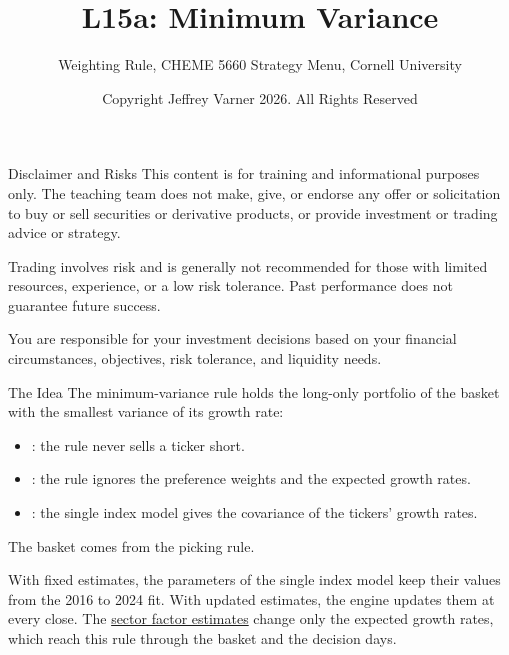 \documentclass[aspectratio=169,11pt]{beamer}
\title{\texorpdfstring{{\vnheavy L15a}}{L15a}: Minimum Variance}
\subtitle{Weighting Rule, CHEME 5660 Strategy Menu, Cornell University}
\author{Copyright Jeffrey Varner 2026. All Rights Reserved}
\newcommand{\repo}{https://github.com/varnerlab/CHEME-5660-CourseRepository-Fall-2026/blob/main/lectures/week-15/L15a}
\begin{document}
\vntitlepage

\begin{frame}{Disclaimer and Risks}
  \vspace{0.6em}
  \textbf{} This content is for training and informational
  purposes only. The teaching team does not make, give, or endorse any offer or
  solicitation to buy or sell securities or derivative products, or provide
  investment or trading advice or strategy.

  \vspace{1.1em}
  \textbf{} Trading involves risk and is generally not recommended for
  those with limited resources, experience, or a low risk tolerance. Past
  performance does not guarantee future success.

  \vspace{1.1em}
  \textbf{} You are responsible for your investment decisions
  based on your financial circumstances, objectives, risk tolerance, and
  liquidity needs.
\end{frame}

\begin{frame}{The Idea}
  \vspace{0.3em}
  The minimum-variance rule holds the long-only portfolio of the basket with the smallest variance of its
  growth rate:
  \begin{itemize}\setlength{\itemsep}{0.5em}
    \item {}: the rule never sells a ticker short.
    \item {}: the rule ignores the preference weights and the expected growth rates.
    \item {}: the single index model gives the covariance of the tickers' growth rates.
  \end{itemize}

  \vspace{0.5em}
  The basket comes from the picking rule.

  \vspace{0.5em}
  With fixed estimates, the parameters of the single index model keep their values from the 2016 to 2024 fit.
  With updated estimates, the engine updates them at every close. The \href{\repo/strategies/slides/CHEME-5660-L15a-Strategy-Sector-Factor-Fall-2026.pdf}{sector factor estimates}
  change only the expected growth rates, which reach this rule through the basket and the decision days.
\end{frame}
\end{document}
